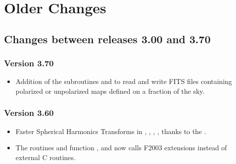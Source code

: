 \documentclass[12pt,twoside]{article}
\newcommand{\mysmaller}{%
\latexhtml{\scriptsize}{\normalsize}}
\newcommand{\compresstext}{%
\latexhtml{%
\setlength{\parsep}{-3ex}%
\setlength{\topsep}{0ex}%
\setlength{\parskip}{0ex}}{}}
\newcommand{\compresslist}{%
\setlength{\itemsep}{0ex}}{}
\begin{document}
\section{Older Changes}
{\mysmaller%
\compresstext
\subsection[Changes between releases 3.00 and 3.70]{Changes between releases 3.00 and 3.70}

\subsubsection{Version 3.70} %
\label{sub:new3p70}
\begin{itemize}\compresslist
\item Addition of the subroutines
and 
to read and write FITS files containing polarized or unpolarized maps defined on a fraction of the sky.
\end{itemize}

\subsubsection{Version 3.60} %
\label{sub:new3p60}
\begin{itemize}\compresslist
\item Faster Spherical Harmonics Transforms
in 
,
,
,
,
 thanks to the .
\item The routines and function 
,
and
now calls F2003 extensions instead of external C routines.
\end{itemize}

}
\end{document}
